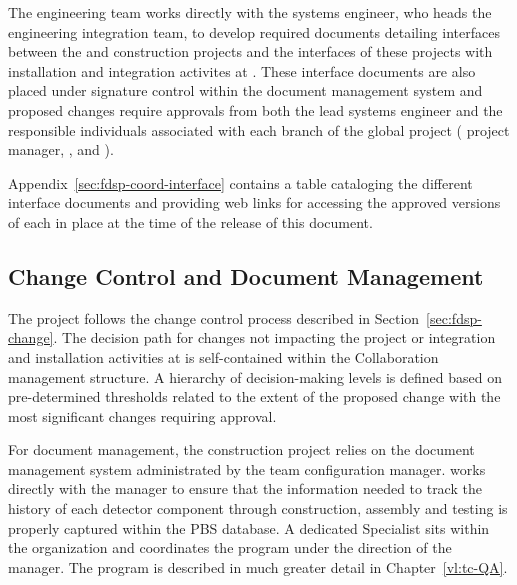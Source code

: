 The  engineering team works directly with the
 systems engineer, who heads the  
engineering integration team, to develop required documents 
detailing interfaces between the  and  
 construction projects and the interfaces of these 
projects with  installation and integration
activites at .  These  interface 
documents are also placed under signature control within the 
 document management system and proposed 
changes require approvals from both the lead  
systems engineer and the responsible individuals associated 
with each branch of the global project ( project 
manager,  , and ).

Appendix~\ref{sec:fdsp-coord-interface} contains a table 
cataloging the different  interface documents 
and providing web links for accessing the approved versions 
of each in place at the time of the release of this document.
 
\subsection{Change Control and Document Management}

The  project follows the  change 
control process described in Section~\ref{sec:fdsp-change}.  
The decision path for changes not impacting the  
project or  integration and installation 
activities at  is self-contained within the 
 Collaboration management structure.  A hierarchy 
of decision-making levels is defined based on pre-determined 
thresholds related to the extent of the proposed change 
with the most significant changes requiring  
 approval.

For document management, the  construction project 
relies on the  document management system 
administrated by the  team configuration manager.  
 works directly with the   
manager to ensure that the information needed to track the 
history of each detector component through construction, 
assembly and testing is properly captured within the PBS 
database.  A dedicated   Specialist 
sits within the  organization and coordinates the 
  program under the direction of the
  manager.  The  
 program is described in much greater detail in 
Chapter~\ref{vl:tc-QA}.
 
